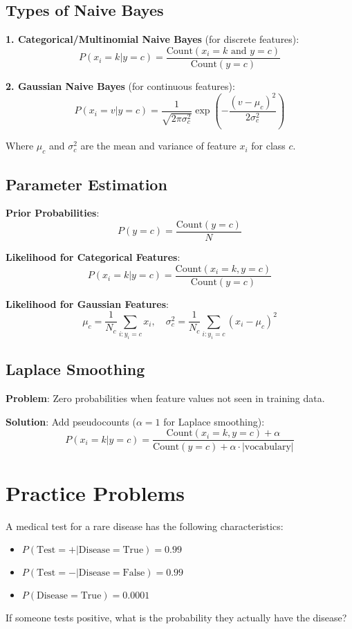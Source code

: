 \documentclass{article}
\newcounter{exercise}
\begin{document}
\subsection{Types of Naive Bayes}

\textbf{1. Categorical/Multinomial Naive Bayes} (for discrete features):
$$P(x_i = k|y = c) = \frac{\text{Count}(x_i = k \text{ and } y = c)}{\text{Count}(y = c)}$$

\textbf{2. Gaussian Naive Bayes} (for continuous features):
$$P(x_i = v|y = c) = \frac{1}{\sqrt{2\pi\sigma_{c}^2}} \exp\left(-\frac{(v-\mu_c)^2}{2\sigma_c^2}\right)$$

Where $\mu_c$ and $\sigma_c^2$ are the mean and variance of feature $x_i$ for class $c$.

\subsection{Parameter Estimation}

\textbf{Prior Probabilities}:
$$P(y = c) = \frac{\text{Count}(y = c)}{N}$$

\textbf{Likelihood for Categorical Features}:
$$P(x_i = k|y = c) = \frac{\text{Count}(x_i = k, y = c)}{\text{Count}(y = c)}$$

\textbf{Likelihood for Gaussian Features}:
$$\mu_c = \frac{1}{N_c} \sum_{i: y_i = c} x_i, \quad \sigma_c^2 = \frac{1}{N_c} \sum_{i: y_i = c} (x_i - \mu_c)^2$$

\subsection{Laplace Smoothing}

\textbf{Problem}: Zero probabilities when feature values not seen in training data.

\textbf{Solution}: Add pseudocounts ($\alpha = 1$ for Laplace smoothing):
$$P(x_i = k|y = c) = \frac{\text{Count}(x_i = k, y = c) + \alpha}{\text{Count}(y = c) + \alpha \cdot |\text{vocabulary}|}$$

\section{Practice Problems}

\begin{tcolorbox}[colback=gray!5!white,colframe=gray!75!black,title=Problem \stepcounter{exercise}: Basic Bayes' Theorem]

A medical test for a rare disease has the following characteristics:
\begin{itemize}
    \item $P(\text{Test} = +|\text{Disease} = \text{True}) = 0.99$
    \item $P(\text{Test} = -|\text{Disease} = \text{False}) = 0.99$
    \item $P(\text{Disease} = \text{True}) = 0.0001$
\end{itemize}

If someone tests positive, what is the probability they actually have the disease?
\end{tcolorbox}
\end{document}
